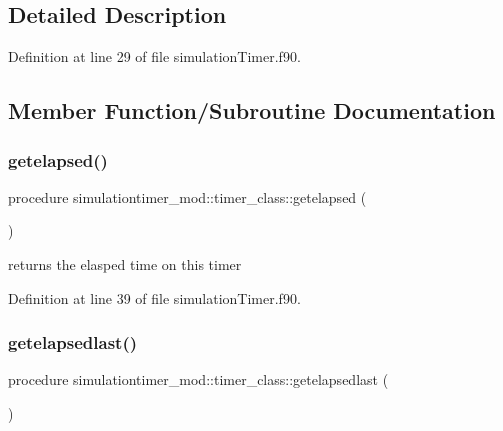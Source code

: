 \subsection{Detailed Description}


Definition at line 29 of file simulation\+Timer.\+f90.



\subsection{Member Function/\+Subroutine Documentation}
\mbox{\label{structsimulationtimer__mod_1_1timer__class_a8d93e7223e1bbd78bc38c72e88fd2e41}} 
\subsubsection{\texorpdfstring{getelapsed()}{getelapsed()}}
{\footnotesize\ttfamily procedure simulationtimer\+\_\+mod\+::timer\+\_\+class\+::getelapsed (\begin{DoxyParamCaption}{ }\end{DoxyParamCaption})\hspace{0.3cm}{\ttfamily [private]}}



returns the elasped time on this timer 



Definition at line 39 of file simulation\+Timer.\+f90.

\mbox{\label{structsimulationtimer__mod_1_1timer__class_afdc04887277d28174b69cfa00ede5f38}} 
\subsubsection{\texorpdfstring{getelapsedlast()}{getelapsedlast()}}
{\footnotesize\ttfamily procedure simulationtimer\+\_\+mod\+::timer\+\_\+class\+::getelapsedlast (\begin{DoxyParamCaption}{ }\end{DoxyParamCaption})\hspace{0.3cm}{\ttfamily [private]}}



